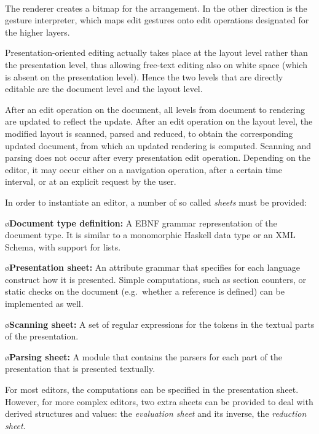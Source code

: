 \documentclass[10pt]{article}
\begin{document}
\\
The renderer creates a bitmap for the arrangement. In the other direction is the gesture interpreter, which maps edit gestures onto edit operations designated for the higher layers.

\ec




\bc
Presentation-oriented editing actually takes place at the layout level rather than the presentation level, thus allowing free-text editing also on white space (which is absent on the presentation level). Hence the two levels that are directly editable are the document level and the layout level. 
\ec

After an edit operation on the document, all levels from document to rendering are updated to reflect the update. After an edit operation on the layout level, the modified layout is scanned, parsed and reduced, to obtain the corresponding updated document, from which an updated rendering is computed. Scanning and parsing does not occur after every presentation edit operation. Depending on the editor, it may occur either on a navigation operation, after a certain time interval, or at an explicit request by the user.

In order to instantiate an editor, a number of so called {\em sheets} must be provided:

\bl
\o{\bf Document type definition:} 
A EBNF grammar representation of the document type. It is similar to a monomorphic Haskell data type or an XML Schema, with support for lists.

\o{\bf Presentation sheet:} 
An attribute grammar that specifies for each language construct how it is presented. Simple computations, such as section counters, or static checks on the document (e.g.\ whether a reference is defined) can be implemented as well.

\o{\bf Scanning sheet:}
A set of regular expressions for the tokens in the textual parts of the presentation.

\o{\bf Parsing sheet:} 
A module that contains the parsers for each part of the presentation that is presented textually.
\el

For most editors, the computations can be specified in the presentation sheet. However, for more complex editors, two extra sheets can be provided to deal with derived structures and values: the {\em evaluation sheet} and its inverse, the {\em reduction sheet}.  
\end{document}
